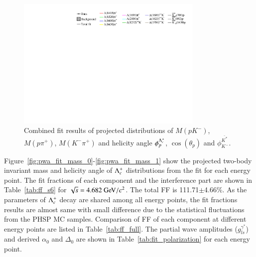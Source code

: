 \begin{figure}[htbp]
    \includegraphics[width=0.80\textwidth]{figure/pwa_nominal/legend.pdf}

    \caption{Combined fit results of projected distributions of $M(pK^-)$, $M(p\pi^+)$, $M(K^-\pi^+)$ and helicity angle $\phi_{p}^{\Lambda_{c}^{+}}$, $\cos(\theta_{p})$ and $\phi_{K^{-}}^{\bar{K^{*}}}$. }
\label{fig:pwa_nominal_comb}
\end{figure}

Figure~\ref{fig:pwa_fit_mass_0}-\ref{fig:pwa_fit_mass_1} show the projected two-body invariant mass and helicity angle of $\Lambda_{c}^{+}$ distributions from the fit for each energy point. The fit fractions of each component and the interference part are shown in Table~\ref{tab:ff_s6} for $\sqrt{s} = 4.682\gev/c^2$. The total FF is 111.71$\pm$4.66\%. As the parameters of $\Lambda_{c}^{+}$ decay are shared among all energy points, the fit fractions results are almost same with small difference due to the statistical fluctuations from the PHSP MC samples. Comparison of FF of each component at different energy points are listed in Table~\ref{tab:ff_full}.  The partial wave amplitudes ($g_{ls}^{\gamma^*}$) and derived $\alpha_0$ and $\Delta_0$ are shown in Table~\ref{tab:fit_polarization} for each energy point.

